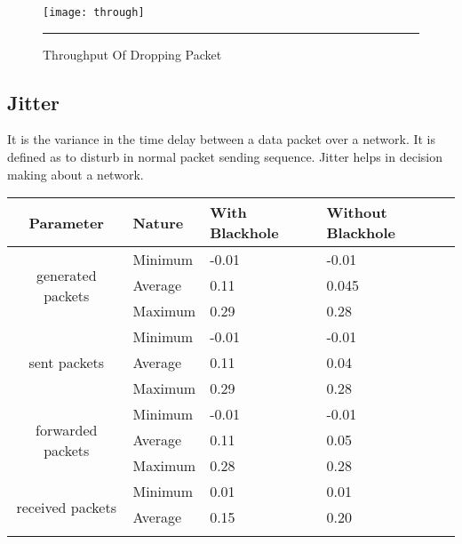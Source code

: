 \begin{figure}[htbp]
	\centering
	\texttt{[image: through]}
	\rule{35em}{0.5pt}
	\caption[Throughput Of Dropping Packet]{Throughput Of Dropping Packet}
	\label{Throughput Of Dropping Packet}
\end{figure}


\subsection{Jitter}
It is the variance in the time delay between a data packet over a network. It is defined as to disturb in normal packet sending sequence. Jitter helps in decision making about a network.


\begin{table}[]
	\begin{tabular}{|c|l|l|l|}
		\hline
		\textbf{Parameter}                 & \textbf{Nature} & \textbf{With Blackhole} & \textbf{Without Blackhole} \\ \hline
		\multirow{3}{*}{generated packets} & Minimum         & -0.01                   & -0.01                      \\ \cline{2-4}
		& Average         & 0.11                    & 0.045                      \\ \cline{2-4}
		& Maximum         & 0.29                    & 0.28                       \\ \hline
		\multirow{3}{*}{sent packets}      & Minimum         & -0.01                   & -0.01                      \\ \cline{2-4}
		& Average         & 0.11                    & 0.04                       \\ \cline{2-4}
		& Maximum         & 0.29                    & 0.28                       \\ \hline
		\multirow{3}{*}{forwarded packets} & Minimum         & -0.01                   & -0.01                      \\ \cline{2-4}
		& Average         & 0.11                    & 0.05                       \\ \cline{2-4}
		& Maximum         & 0.28                    & 0.28                       \\ \hline
		\multirow{3}{*}{received packets}  & Minimum         & 0.01                    & 0.01                       \\ \cline{2-4}
		& Average         & 0.15                    & 0.20                       \\ \cline{2-4}

\end{tabular}
\end{table}

